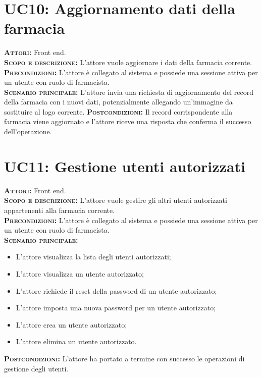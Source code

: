 \section{UC10: Aggiornamento dati della farmacia}
\label{sec:UC10}
\textsc{\textbf{Attori:}} Front end.\\
\textsc{\textbf{Scopo e descrizione:}} L'attore vuole aggiornare i dati della farmacia corrente.\\
\textsc{\textsc{\textbf{Precondizioni:}}} L'attore è collegato al sistema e possiede una sessione attiva per un utente con ruolo di farmacista.\\
\textsc{\textbf{Scenario principale:}} L'attore invia una richiesta di aggiornamento del record della farmacia con i nuovi dati, potenzialmente allegando un'immagine da sostituire al logo corrente.
\textsc{\textbf{Postcondizioni:}} Il record corrispondente alla farmacia viene aggiornato e l'attore riceve una risposta che conferma il successo dell'operazione.

\section{UC11: Gestione utenti autorizzati}
\label{sec:UC11}
\textsc{\textbf{Attori:}} Front end.\\
\textsc{\textbf{Scopo e descrizione:}} L'attore vuole gestire gli altri utenti autorizzati appartenenti alla farmacia corrente.\\
\textsc{\textsc{\textbf{Precondizioni:}}} L'attore è collegato al sistema e possiede una sessione attiva per un utente con ruolo di farmacista.\\
\textsc{\textbf{Scenario principale:}}
\begin{itemize}
    \item L'attore visualizza la lista degli utenti autorizzati;
    \item L'attore visualizza un utente autorizzato;
    \item L'attore richiede il reset della password di un utente autorizzato;
    \item L'attore imposta una nuova password per un utente autorizzato;
    \item L'attore crea un utente autorizzato;
    \item L'attore elimina un utente autorizzato.
\end{itemize}
\textsc{\textbf{Postcondizioni:}} L'attore ha portato a termine con successo le operazioni di gestione degli utenti.

